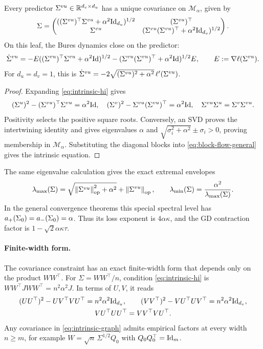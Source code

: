 \begin{proposition}\label{prop:intrinsic-hi}
Every predictor \(\Sigma^{vu}\in\mathbb{R}^{d_v\times d_u}\) has a unique covariance
on \(\mathcal M_\alpha\), given by
\begin{equation}\label{eq:intrinsic-graph}
 \Sigma=
 \begin{pmatrix}
 ((\Sigma^{vu})^\top\Sigma^{vu}+\alpha^2\mathrm{Id}_{d_u})^{1/2}&(\Sigma^{vu})^\top\\
 \Sigma^{vu}&(\Sigma^{vu}(\Sigma^{vu})^\top+\alpha^2\mathrm{Id}_{d_v})^{1/2}
 \end{pmatrix}.
\end{equation}
On this leaf, the Bures dynamics close on the predictor:
\begin{equation}\label{eq:intrinsic-hyperbolic-dynamics}
 \dot{\Sigma}^{vu}=-E((\Sigma^{vu})^\top\Sigma^{vu}+\alpha^2\mathrm{Id})^{1/2}
       -(\Sigma^{vu}(\Sigma^{vu})^\top+\alpha^2\mathrm{Id})^{1/2}E,
 \qquad E:=\nabla\ell(\Sigma^{vu}).
\end{equation}
For \(d_u=d_v=1\), this is
\(\dot{\Sigma}^{vu}=-2\sqrt{(\Sigma^{vu})^2+\alpha^2}\,\ell'(\Sigma^{vu})\).
\end{proposition}
\begin{proof}
Expanding \eqref{eq:intrinsic-hi} gives
\[
 (\Sigma^u)^2-(\Sigma^{vu})^\top\Sigma^{vu}=\alpha^2\mathrm{Id},\quad
 (\Sigma^v)^2-\Sigma^{vu}(\Sigma^{vu})^\top=\alpha^2\mathrm{Id},\quad
 \Sigma^{vu}\Sigma^u=\Sigma^v\Sigma^{vu}.
\]
Positivity selects the positive square roots. Conversely, an SVD proves
the intertwining identity and gives eigenvalues \(\alpha\) and
\(\sqrt{\sigma_i^2+\alpha^2}\pm\sigma_i>0\), proving membership in
\(\mathcal M_\alpha\). Substituting the diagonal blocks into
\eqref{eq:block-flow-general} gives the intrinsic equation.
\end{proof}
The same eigenvalue calculation gives the exact extremal envelopes
\[
 \lambda_{\max}(\Sigma)=\sqrt{\left\lVert \Sigma^{vu} \right\rVert_{\mathrm{op}}^2+\alpha^2}
                         +\left\lVert \Sigma^{vu} \right\rVert_{\mathrm{op}},\qquad
 \lambda_{\min}(\Sigma)=\frac{\alpha^2}{\lambda_{\max}(\Sigma)}.
\]
In the general convergence theorems this special spectral level has
\(a_+(\Sigma_0)=a_-(\Sigma_0)=\alpha\). Thus its loss exponent is \(4\alpha\kappa\),
and the GD contraction factor is \(1-\sqrt2\alpha\kappa\tau\).

\paragraph{Finite-width form.}
The covariance constraint has an exact finite-width form that depends
only on the product $WW^\top$.
For \(\Sigma=WW^\top/n\), condition \eqref{eq:intrinsic-hi} is
\(WW^\top JWW^\top=n^2\alpha^2J\). In terms of \(U,V\), it reads
\[
 \begin{gathered}
 (UU^\top)^2-UV^\top VU^\top=n^2\alpha^2\mathrm{Id}_{d_u},\qquad
 (VV^\top)^2-VU^\top UV^\top=n^2\alpha^2\mathrm{Id}_{d_v},\\
 VU^\top UU^\top=VV^\top VU^\top.
 \end{gathered}
\]
Any covariance in \eqref{eq:intrinsic-graph} admits empirical factors at
every width \(n\ge m\), for example \(W=\sqrt n\,\Sigma^{1/2}Q_0\)
with \(Q_0Q_0^\top=\mathrm{Id}_m\).

